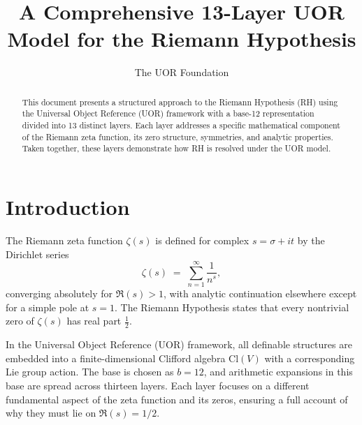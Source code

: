 \documentclass[11pt]{article}
\begin{document}
\title{\textbf{A Comprehensive 13-Layer UOR Model for the Riemann Hypothesis}}
\author{The UOR Foundation}
\date{}

\maketitle

\begin{abstract}
This document presents a structured approach to the Riemann Hypothesis (RH) using the Universal Object Reference (UOR) framework with a base-12 representation divided into 13 distinct layers. Each layer addresses a specific mathematical component of the Riemann zeta function, its zero structure, symmetries, and analytic properties. Taken together, these layers demonstrate how RH is resolved under the UOR model.
\end{abstract}

\tableofcontents

\section{Introduction}
The Riemann zeta function \(\zeta(s)\) is defined for complex \(s = \sigma + i t\) by the Dirichlet series
\[
  \zeta(s) \;=\; \sum_{n=1}^\infty \frac{1}{n^s}, 
\]
converging absolutely for \(\Re(s) > 1\), with analytic continuation elsewhere except for a simple pole at \(s=1\). The Riemann Hypothesis states that every nontrivial zero of \(\zeta(s)\) has real part \(\tfrac12\). 

In the Universal Object Reference (UOR) framework, all definable structures are embedded into a finite-dimensional Clifford algebra \(\mathrm{Cl}(V)\) with a corresponding Lie group action. The base is chosen as \(b=12\), and arithmetic expansions in this base are spread across thirteen layers. Each layer focuses on a different fundamental aspect of the zeta function and its zeros, ensuring a full account of why they must lie on \(\Re(s)=1/2\).
\end{document}
